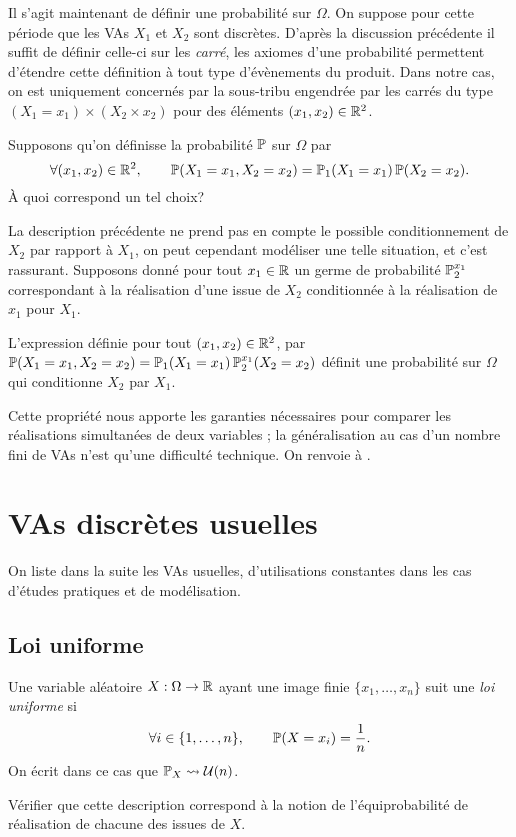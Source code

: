 \documentclass[11pt, a4paper]{article}
\begin{document}
Il s'agit maintenant de définir une probabilité sur $\Omega$. On
suppose pour cette période que les VAs $X_1$ et $X_2$ sont
discrètes. D'après la discussion précédente il suffit de définir
celle-ci sur les \textit{carré}, les axiomes d'une probabilité
permettent d'étendre cette définition à tout type d'évènements du
produit. Dans notre cas, on est uniquement concernés par la sous-tribu
engendrée par les carrés du type $(X_1 = x_1) \times (X_2 \times x_2)$
pour des éléments $(x_1, x_2) \in \mathbb{R}^2$.
\begin{question}
  Supposons qu'on définisse la probabilité $\operatorname{\mathbb{P}}$ sur $\Omega$ par
  \[
    \forall (x_1, x_2) \in \mathbb{R}^2, \qquad \operatorname{\mathbb{P}}(X_1= x_1, X_2 = x_2) =
    \operatorname{\mathbb{P}}_1(X_1 = x_1)\operatorname{\mathbb{P}}(X_2 = x_2).
  \]
  À quoi correspond un tel choix?
\end{question}
La description précédente ne prend pas en compte le possible
conditionnement de $X_2$ par rapport à $X_1$, on peut cependant
modéliser une telle situation, et c'est rassurant. Supposons donné
pour tout $x_1 \in \mathbb{R}$ un germe de probabilité $\operatorname{\mathbb{P}}_2^{x_1}$
correspondant à la réalisation d'une issue de $X_2$ conditionnée à la
réalisation de $x_1$ pour $X_1$.
\begin{prop}
  L'expression définie pour tout $(x_1, x_2) \in \mathbb{R}^2$, par
  $\operatorname{\mathbb{P}}(X_1 = x_1, X_2 = x_2) = \operatorname{\mathbb{P}}_1(X_1 = x_1)\operatorname{\mathbb{P}}_2^{x_1}(X_2 = x_2)$
  définit une probabilité sur $\Omega$ qui conditionne $X_2$ par
  $X_1$.
\end{prop}
Cette propriété nous apporte les garanties nécessaires pour comparer
les réalisations simultanées de deux variables ; la généralisation au
cas d'un nombre fini de VAs n'est qu'une difficulté technique. On
renvoie à \cite[pages 65-67 \& 93]{ouvrard1998probabilites}.

\section{VAs discrètes usuelles}
\label{sec:VAsdiscretesusuelles}

On liste dans la suite les VAs usuelles, d'utilisations constantes
dans les cas d'études pratiques et de modélisation.

\subsection{Loi uniforme}
\label{sec:loiuniforme}

Une variable aléatoire $X : \Omega \to \mathbb{R}$ ayant une image finie
$\{x_1, \ldots, x_n\}$ suit une \emph{loi uniforme} si
\[
  \forall i \in \{1, \ldots, n\}, \qquad \operatorname{\mathbb{P}}(X = x_i) = \frac{1}{n}.
\]
On écrit dans ce cas que $\operatorname{\mathbb{P}}_X \leadsto \mathcal{U}(n)$.
\begin{question}
  Vérifier que cette description correspond à la notion de
  l'équiprobabilité de réalisation de chacune des issues de $X$.
\end{question}
\end{document}
